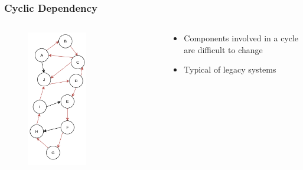 \documentclass[dvipsnames, 10pt, table]{beamer}
\begin{document}
\begin{frame}
  \frametitle{Cyclic Dependency}
  \begin{columns}
    \begin{column}{0.5\textwidth}
      \begin{figure}
        \begin{center}
          \includegraphics[width=0.55\textwidth]{figures/architectural-smells/cyclic-dependency.png}
        \end{center}
      \end{figure}
    \end{column}
    \begin{column}{0.5\textwidth}
      \begin{itemize}
        \item Components involved in a cycle are difficult to change
        \item Typical of legacy systems
      \end{itemize}
    \end{column}
  \end{columns}
\end{frame}
\end{document}
